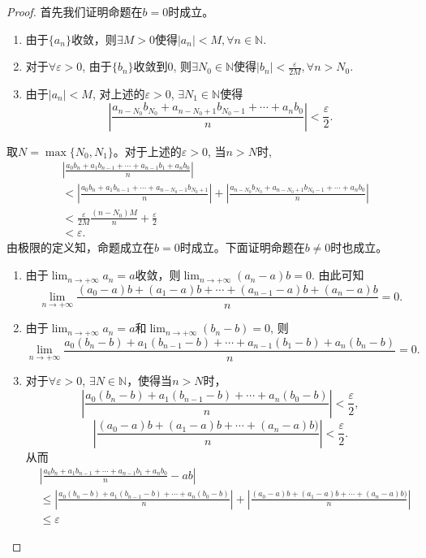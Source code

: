 \documentclass[utf8]{book}
\begin{document}
\begin{proof}
首先我们证明命题在$b=0$时成立。
\begin{enumerate}
\renewcommand\labelenumi{\normalfont(\theenumi)}
\item 由于$\{a_n\}$收敛，则$\exists M > 0$使得$|a_n| < M, \forall n \in \mathbb {N}$.
\item 对于$\forall \varepsilon > 0$, 由于$\{b_n\}$收敛到$0$, 则$\exists N_0 \in \mathbb {N}$使得$|b_n| < \frac{\varepsilon}{2M}, \forall n > N_0$.
\item 由于$|a_n| < M$, 对上述的$\varepsilon > 0$, $\exists N_1 \in \mathbb{N}$使得
$$\left|\frac{a_{n - N_0}b_{N_0} + a_{n - N_0 + 1}b_{N_0 - 1}+\cdots + a_nb_0}{n}\right| < \frac{\varepsilon}{2}.$$
\end{enumerate}
取$N = \max\{N_0, N_1\}$。对于上述的$\varepsilon > 0$, 当$n > N$时,
\begin{equation*}
\begin{split}
&\left | \frac{a_0b_n+a_1b_{n-1}+\cdots+a_{n-1}b_1+a_nb_0}{n} \right | \\
&< \left | \frac{a_0b_n+a_1b_{n-1}+\cdots+a_{n-N_0-1}b_{N_0+1}}{n}\right| 
+ \left | \frac{a_{n-N_0}b_{N_0}+ a_{n-N_0 + 1}b_{N_0-1}+\cdots+a_{n}b_0}{n}\right|\\
&< \frac{\varepsilon}{2M}\frac{(n - N_0)M}{n} + \frac{\varepsilon}{2}\\
&< \varepsilon.
	\end{split}
\end{equation*}
由极限的定义知，命题成立在$b=0$时成立。下面证明命题在$b\neq 0$时也成立。
\begin{enumerate}
\renewcommand\labelenumi{\normalfont(\theenumi)}
\item 由于$\displaystyle \lim_{n\to +\infty}a_n = a$收敛，则$\displaystyle \lim_{n\to +\infty}(a_n - a)b = 0$. 由此可知
$$\displaystyle \lim_{n\to +\infty}\frac{(a_0-a)b+(a_1-a)b+\cdots+(a_{n-1}-a)b+(a_n-a)b}{n}= 0.$$
\item 由于$\displaystyle \lim_{n\to +\infty}a_n = a$和$\displaystyle \lim_{n\to +\infty}(b_n - b) = 0$, 则
$$\displaystyle \lim_{n\to +\infty}\frac{a_0(b_n-b)+a_1(b_{n-1} - b)+\cdots+a_{n-1}(b_1 - b)+a_n(b_n-b)}{n}= 0.$$
\item 对于$\forall \varepsilon > 0$, $\exists N \in \mathbb {N}$，使得当$n > N$时， 
$$\left | \frac{a_0(b_n-b)+a_1(b_{n-1}-b)+\cdots+a_n(b_0-b)}{n}\right| < \frac{\varepsilon}{2},$$
$$\left | \frac{(a_0-a)b+(a_1 - a)b+\cdots+(a_n-a)b)}{n}\right| < \frac{\varepsilon}{2}.$$
从而 
\begin{equation*}
\begin{split}
&\left | \frac{a_0b_n+a_1b_{n-1}+\cdots+a_{n-1}b_1+a_nb_0}{n} - ab \right | \\
&\leq \left | \frac{a_0(b_n-b)+a_1(b_{n-1}-b)+\cdots+a_n(b_0-b)}{n}\right| + \left|\frac{(a_0-a)b+(a_1 - a)b+\cdots+(a_n-a)b)}{n}\right|\\&\leq \varepsilon
\end{split}
\end{equation*}
\end{enumerate}
\end{proof}
\end{document}
